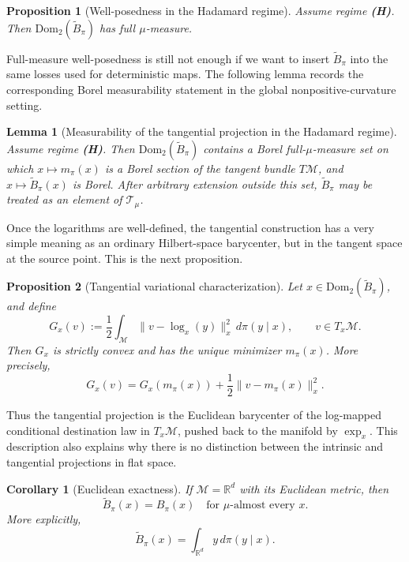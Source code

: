 \documentclass[10pt]{article} %
\newtheorem{proposition}[proposition]{Proposition}
\newtheorem{lemma}[lemma]{Lemma}
\newtheorem{corollary}[corollary]{Corollary}
\theoremstyle{definition}
\providecommand{\R}{\mathbb{R}}
\providecommand{\1}{\mathbf{1}}
\providecommand{\sM}{\mathcal{M}}
\begin{document}
\begin{proposition}[Well-posedness in the Hadamard regime]
\label{prop:tangent_hadamard}
Assume regime \textbf{(H)}. Then $\mathrm{Dom}_2(\widetilde B_\pi)$ has full $\mu$-measure.
\end{proposition}



Full-measure well-posedness is still not enough if we want to insert $\widetilde B_\pi$ into the same losses used for deterministic maps. The following lemma records the corresponding Borel measurability statement in the global nonpositive-curvature setting.

\begin{lemma}[Measurability of the tangential projection in the Hadamard regime]
\label{lem:tangent_measurable}
Assume regime \textbf{(H)}. Then $\mathrm{Dom}_2(\widetilde B_\pi)$ contains a Borel full-$\mu$-measure set on which $x\mapsto m_\pi(x)$ is a Borel section of the tangent bundle $T\sM$, and $x\mapsto\widetilde B_\pi(x)$ is Borel. After arbitrary extension outside this set, $\widetilde B_\pi$ may be treated as an element of $\mathcal T_\mu$.
\end{lemma}




Once the logarithms are well-defined, the tangential construction has a very simple meaning as an ordinary Hilbert-space barycenter, but in the tangent space at the source point. This is the next proposition.

\begin{proposition}[Tangential variational characterization]
\label{prop:tangent_variational}
Let $x\in\mathrm{Dom}_2(\widetilde B_\pi)$, and define
\[
G_x(v):=\frac12\int_{\sM}\|v-\log_x(y)\|_x^2\,d\pi(y\mid x),
\qquad v\in T_x\sM.
\]
Then $G_x$ is strictly convex and has the unique minimizer $m_\pi(x)$. More precisely,
\[
G_x(v)=G_x(m_\pi(x))+\frac12\|v-m_\pi(x)\|_x^2.
\]
\end{proposition}



Thus the tangential projection is the Euclidean barycenter of the log-mapped conditional destination law in $T_x\sM$, pushed back to the manifold by $\exp_x$. This description also explains why there is no distinction between the intrinsic and tangential projections in flat space.

\begin{corollary}[Euclidean exactness]
\label{cor:euclidean_exactness}
If $\sM=\R^d$ with its Euclidean metric, then
\[
\widetilde B_\pi(x)=B_\pi(x)
\quad\text{for }\mu\text{-almost every }x.
\]
More explicitly,
\[
\widetilde B_\pi(x)=\int_{\R^d}y\,d\pi(y\mid x).
\]
\end{corollary}
\end{document}
